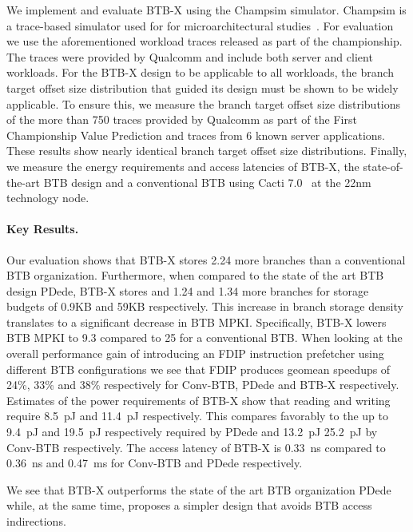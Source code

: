 \documentclass[../main.tex]{subfiles}
\begin{document}
\begin{refsection}
We implement and evaluate BTB-X using the Champsim simulator. Champsim
is a trace-based simulator used for for microarchitectural
studies~\cite{champsim}. For evaluation we use the aforementioned
workload traces released as part of the  championship. The traces
were provided by Qualcomm and include both server and client
workloads. For the BTB-X design to be applicable to all workloads, the
branch target offset size distribution that guided its design must be
shown to be widely applicable. To ensure this, we measure the branch
target offset size distributions of the more than 750 traces provided
by Qualcomm as part of the First Championship Value Prediction 
and traces from 6 known server applications. These results show nearly
identical branch target offset size distributions.
Finally, we measure the energy requirements and access latencies of
BTB-X, the state-of-the-art BTB design and a conventional BTB using Cacti 7.0~\cite{cacti} at the 22nm technology node.

\paragraph{Key Results.}

Our evaluation shows that BTB-X stores 2.24\texttimes{} more branches
than a conventional BTB organization. Furthermore, when compared to
the state of the art BTB design PDede, BTB-X stores  and
1.24\texttimes{} and 1.34\texttimes{} more branches for storage budgets of
0.9KB and 59KB respectively. This increase in branch storage density
translates to a significant decrease in BTB MPKI. Specifically, BTB-X lowers BTB MPKI to 9.3 compared to 25 for a conventional BTB. When looking at the overall performance gain of introducing an FDIP instruction prefetcher using different BTB configurations we see that FDIP produces geomean speedups of 24\%, 33\% and 38\% respectively for Conv-BTB, PDede and BTB-X respectively. Estimates of the power requirements of BTB-X show that reading and writing require 8.5~pJ and 11.4~pJ respectively. This compares favorably to the up to 9.4~pJ and 19.5~pJ respectively required by PDede and 13.2~pJ 25.2~pJ by Conv-BTB respectively. The access latency of BTB-X is 0.33~ns compared to 0.36~ns and 0.47~ms for Conv-BTB and PDede respectively.

We see that BTB-X outperforms the state of the art BTB organization PDede while, at the same time, proposes a simpler design that avoids BTB access indirections.



\end{refsection}
\end{document}
